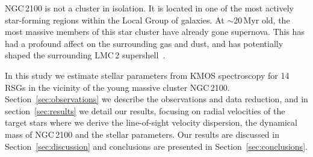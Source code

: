 \documentclass[useAMS,usenatbib]{mn2e}
\def\kms{$\mbox{km s}^{-1}$}
\begin{document}
NGC\,2100 is not a cluster in isolation.
It is located in one of the most actively star-forming regions within the Local Group of galaxies.
At $\sim$20\,Myr old, the most massive members of this star cluster have already gone supernova.
This has had a profound affect on the surrounding gas and dust, and has potentially shaped the surrounding LMC\,2 supershell~\citep[see][]{1999ApJ...518..298P}.



In this study we estimate stellar parameters from KMOS spectroscopy for 14 RSGs in the vicinity of the young massive cluster NGC\,2100.
Section~\ref{sec:observations} we describe the observations and data reduction, and in section~\ref{sec:results} we detail our results, focusing on radial velocities of the target stars where we derive the line-of-sight velocity dispersion, the dynamical mass of NGC\,2100 and the stellar parameters.
Our results are discussed in Section~\ref{sec:discussion} and conclusions are presented in Section~\ref{sec:conclusions}.










\end{document}
